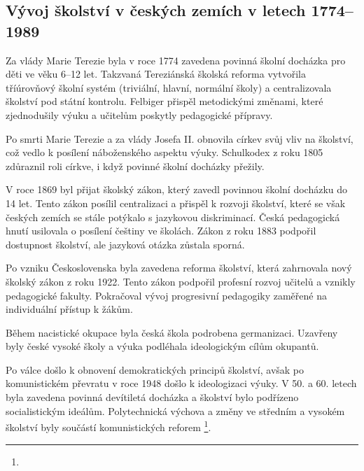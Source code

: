 \documentclass[a4paper,12pt,twoside,FP]{article}
\begin{document}
\subsection{Vývoj školství v českých zemích v letech 1774–1989}
Za vlády Marie Terezie byla v roce 1774 zavedena povinná školní docházka pro děti ve věku 6–12 let. Takzvaná Tereziánská školská reforma vytvořila tříúrovňový školní systém (triviální, hlavní, normální školy) a centralizovala školství pod státní kontrolu. Felbiger přispěl metodickými změnami, které zjednodušily výuku a učitelům poskytly pedagogické přípravy.

Po smrti Marie Terezie a za vlády Josefa II. obnovila církev svůj vliv na školství, což vedlo k posílení náboženského aspektu výuky. Schulkodex z roku 1805 zdůraznil roli církve, i když povinné školní docházky přežily.

V roce 1869 byl přijat školský zákon, který zavedl povinnou školní docházku do 14 let. Tento zákon posílil centralizaci a přispěl k rozvoji školství, které se však českých zemích se stále potýkalo s jazykovou diskriminací. Česká pedagogická hnutí usilovala o posílení češtiny ve školách. Zákon z roku 1883 podpořil dostupnost školství, ale jazyková otázka zůstala sporná.

Po vzniku Československa byla zavedena reforma školství, která zahrnovala nový školský zákon z roku 1922. Tento zákon podpořil profesní rozvoj učitelů a vznikly pedagogické fakulty. Pokračoval vývoj progresivní pedagogiky zaměřené na individuální přístup k žákům.

Během nacistické okupace byla česká škola podrobena germanizaci. Uzavřeny byly české vysoké školy a výuka podléhala ideologickým cílům okupantů.

Po válce došlo k obnovení demokratických principů školství, avšak po komunistickém převratu v roce 1948 došlo k ideologizaci výuky. V 50. a 60. letech byla zavedena povinná devítiletá docházka a školství bylo podřízeno socialistickým ideálům. Polytechnická výchova a změny ve středním a vysokém školství byly součástí komunistických reforem \footnote{}.

\clearpage
\end{document}
